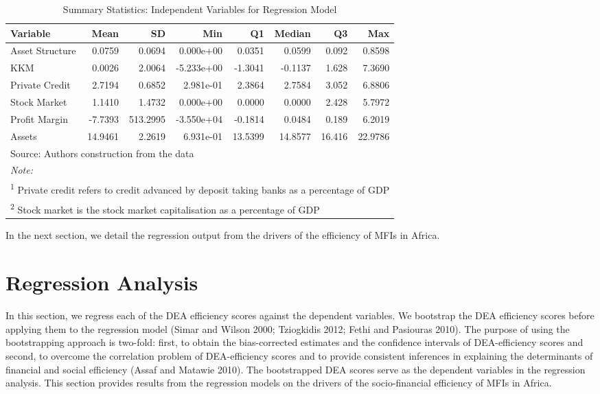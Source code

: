 \documentclass[
]{article}
\begin{document}
\begin{table}

\caption{\label{tab:unnamed-chunk-25}Summary Statistics: Independent Variables for Regression Model}
\centering
\fontsize{10}{12}\selectfont
\begin{tabular}[t]{lrrrrrrr}
\toprule
Variable & Mean & SD & Min & Q1 & Median & Q3 & Max\\
\midrule
Asset Structure & 0.0759 & 0.0694 & 0.000e+00 & 0.0351 & 0.0599 & 0.092 & 0.8598\\
KKM & 0.0026 & 2.0064 & -5.233e+00 & -1.3041 & -0.1137 & 1.628 & 7.3690\\
Private Credit & 2.7194 & 0.6852 & 2.981e-01 & 2.3864 & 2.7584 & 3.052 & 6.8806\\
Stock Market & 1.1410 & 1.4732 & 0.000e+00 & 0.0000 & 0.0000 & 2.428 & 5.7972\\
Profit Margin & -7.7393 & 513.2995 & -3.550e+04 & -0.1814 & 0.0484 & 0.189 & 6.2019\\
\addlinespace
Assets & 14.9461 & 2.2619 & 6.931e-01 & 13.5399 & 14.8577 & 16.416 & 22.9786\\
\bottomrule
\multicolumn{8}{l}{\rule{0pt}{1em}Source: Authors construction from the data}\\
\multicolumn{8}{l}{\rule{0pt}{1em}\textit{Note: }}\\
\multicolumn{8}{l}{\rule{0pt}{1em}\textsuperscript{1} Private credit refers to credit advanced by deposit taking banks as a percentage of GDP}\\
\multicolumn{8}{l}{\rule{0pt}{1em}\textsuperscript{2} Stock market is the stock market capitalisation as a percentage of GDP}\\
\end{tabular}
\end{table}

In the next section, we detail the regression output from the drivers of
the efficiency of MFIs in Africa.

\hypertarget{regression-analysis}{%
\section{Regression Analysis}\label{regression-analysis}}

In this section, we regress each of the DEA efficiency scores against
the dependent variables. We bootstrap the DEA efficiency scores before
applying them to the regression model (Simar and Wilson 2000; Tziogkidis
2012; Fethi and Pasiouras 2010). The purpose of using the bootstrapping
approach is two-fold: first, to obtain the bias-corrected estimates and
the confidence intervals of DEA-efficiency scores and second, to
overcome the correlation problem of DEA-efficiency scores and to provide
consistent inferences in explaining the determinants of financial and
social efficiency (Assaf and Matawie 2010). The bootstrapped DEA scores
serve as the dependent variables in the regression analysis. This
section provides results from the regression models on the drivers of
the socio-financial efficiency of MFIs in Africa.
\end{document}
